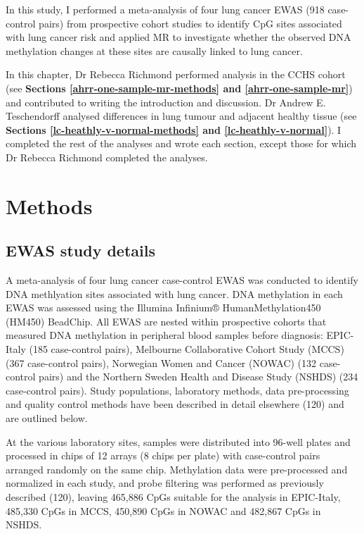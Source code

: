 \documentclass[11pt,oneside]{bristolthesis}
\begin{document}
In this study, I performed a meta-analysis of four lung cancer EWAS (918 case-control pairs) from prospective cohort studies to identify CpG sites associated with lung cancer risk and applied MR to investigate whether the observed DNA methylation changes at these sites are causally linked to lung cancer.

In this chapter, Dr Rebecca Richmond performed analysis in the CCHS cohort (see \textbf{Sections \ref{ahrr-one-sample-mr-methods} and \ref{ahrr-one-sample-mr}}) and contributed to writing the introduction and discussion. Dr Andrew E. Teschendorff analysed differences in lung tumour and adjacent healthy tissue (see \textbf{Sections \ref{lc-heathly-v-normal-methods} and \ref{lc-heathly-v-normal}}). I completed the rest of the analyses and wrote each section, except those for which Dr Rebecca Richmond completed the analyses.

\hypertarget{methods-07}{%
\section{Methods}\label{methods-07}}

\hypertarget{ewas-study-details}{%
\subsection{EWAS study details}\label{ewas-study-details}}

A meta-analysis of four lung cancer case-control EWAS was conducted to identify DNA methlyation sites associated with lung cancer. DNA methylation in each EWAS was assessed using the Illumina Infinium® HumanMethylation450 (HM450) BeadChip. All EWAS are nested within prospective cohorts that measured DNA methylation in peripheral blood samples before diagnosis: EPIC-Italy (185 case-control pairs), Melbourne Collaborative Cohort Study (MCCS) (367 case-control pairs), Norwegian Women and Cancer (NOWAC) (132 case-control pairs) and the Northern Sweden Health and Disease Study (NSHDS) (234 case-control pairs). Study populations, laboratory methods, data pre-processing and quality control methods have been described in detail elsewhere (120) and are outlined below.

At the various laboratory sites, samples were distributed into 96-well plates and processed in chips of 12 arrays (8 chips per plate) with case-control pairs arranged randomly on the same chip. Methylation data were pre-processed and normalized in each study, and probe filtering was performed as previously described (120), leaving 465,886 CpGs suitable for the analysis in EPIC-Italy, 485,330 CpGs in MCCS, 450,890 CpGs in NOWAC and 482,867 CpGs in NSHDS.
\end{document}
